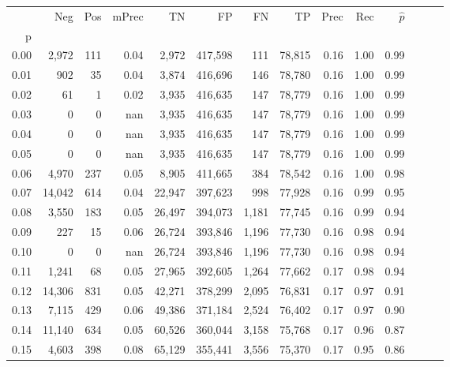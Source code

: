 \begin{tabular}{rrrrrrrrrrrrrr}
\toprule
{} &     Neg &    Pos & mPrec &       TN &       FP &      FN &      TP &  Prec &   Rec & $\hat{p}$ \\
p    &         &        &       &          &          &         &         &       &       &           \\
\midrule
0.00 &   2,972 &    111 &  0.04 &    2,972 &  417,598 &     111 &  78,815 &  0.16 &  1.00 &      0.99 \\
0.01 &     902 &     35 &  0.04 &    3,874 &  416,696 &     146 &  78,780 &  0.16 &  1.00 &      0.99 \\
0.02 &      61 &      1 &  0.02 &    3,935 &  416,635 &     147 &  78,779 &  0.16 &  1.00 &      0.99 \\
0.03 &       0 &      0 &   nan &    3,935 &  416,635 &     147 &  78,779 &  0.16 &  1.00 &      0.99 \\
0.04 &       0 &      0 &   nan &    3,935 &  416,635 &     147 &  78,779 &  0.16 &  1.00 &      0.99 \\
0.05 &       0 &      0 &   nan &    3,935 &  416,635 &     147 &  78,779 &  0.16 &  1.00 &      0.99 \\
0.06 &   4,970 &    237 &  0.05 &    8,905 &  411,665 &     384 &  78,542 &  0.16 &  1.00 &      0.98 \\
0.07 &  14,042 &    614 &  0.04 &   22,947 &  397,623 &     998 &  77,928 &  0.16 &  0.99 &      0.95 \\
0.08 &   3,550 &    183 &  0.05 &   26,497 &  394,073 &   1,181 &  77,745 &  0.16 &  0.99 &      0.94 \\
0.09 &     227 &     15 &  0.06 &   26,724 &  393,846 &   1,196 &  77,730 &  0.16 &  0.98 &      0.94 \\
0.10 &       0 &      0 &   nan &   26,724 &  393,846 &   1,196 &  77,730 &  0.16 &  0.98 &      0.94 \\
0.11 &   1,241 &     68 &  0.05 &   27,965 &  392,605 &   1,264 &  77,662 &  0.17 &  0.98 &      0.94 \\
0.12 &  14,306 &    831 &  0.05 &   42,271 &  378,299 &   2,095 &  76,831 &  0.17 &  0.97 &      0.91 \\
0.13 &   7,115 &    429 &  0.06 &   49,386 &  371,184 &   2,524 &  76,402 &  0.17 &  0.97 &      0.90 \\
0.14 &  11,140 &    634 &  0.05 &   60,526 &  360,044 &   3,158 &  75,768 &  0.17 &  0.96 &      0.87 \\
0.15 &   4,603 &    398 &  0.08 &   65,129 &  355,441 &   3,556 &  75,370 &  0.17 &  0.95 &      0.86 \\

\end{tabular}
